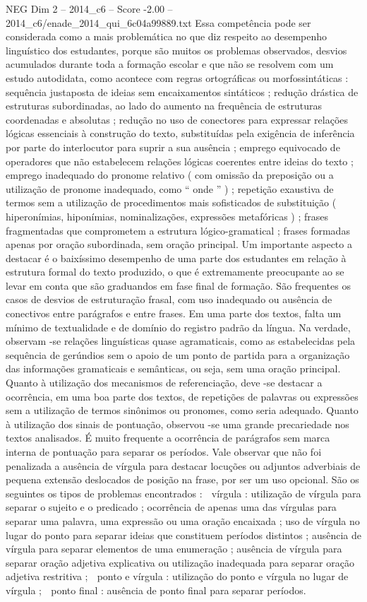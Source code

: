 \begin{textsample}{NEG Dim 2 – 2014\_c6 – Score -2.00 – 2014\_c6/enade\_2014\_qui\_6c04a99889.txt}
Essa competência pode ser considerada como a mais problemática no que diz respeito ao desempenho linguístico dos estudantes, porque são muitos os problemas observados, desvios acumulados durante toda a formação escolar e que não se resolvem com um estudo autodidata, como acontece com regras ortográficas ou morfossintáticas : sequência justaposta de ideias sem encaixamentos sintáticos ; redução drástica de estruturas subordinadas, ao lado do aumento na frequência de estruturas coordenadas e absolutas ; redução no uso de conectores para expressar relações lógicas essenciais à construção do texto, substituídas pela exigência de inferência por parte do interlocutor para suprir a sua ausência ; emprego equivocado de operadores que não estabelecem relações lógicas coerentes entre ideias do texto ; emprego inadequado do pronome relativo ( com omissão da preposição ou a utilização de pronome inadequado, como “ onde ” ) ; repetição exaustiva de termos sem a utilização de procedimentos mais sofisticados de substituição ( hiperonímias, hiponímias, nominalizações, expressões metafóricas ) ; frases fragmentadas que comprometem a estrutura lógico-gramatical ; frases formadas apenas por oração subordinada, sem oração principal.
Um importante aspecto a destacar é o baixíssimo desempenho de uma parte dos estudantes em relação à estrutura formal do texto produzido, o que é extremamente preocupante ao se levar em conta que são graduandos em fase final de formação.
São frequentes os casos de desvios de estruturação frasal, com uso inadequado ou ausência de conectivos entre parágrafos e entre frases.
Em uma parte dos textos, falta um mínimo de textualidade e de domínio do registro padrão da língua.
Na verdade, observam -se relações linguísticas quase agramaticais, como as estabelecidas pela sequência de gerúndios sem o apoio de um ponto de partida para a organização das informações gramaticais e semânticas, ou seja, sem uma oração principal.
Quanto à utilização dos mecanismos de referenciação, deve -se destacar a ocorrência, em uma boa parte dos textos, de repetições de palavras ou expressões sem a utilização de termos sinônimos ou pronomes, como seria adequado.
Quanto à utilização dos sinais de pontuação, observou -se uma grande precariedade nos textos analisados.
É muito frequente a ocorrência de parágrafos sem marca interna de pontuação para separar os períodos.
Vale observar que não foi penalizada a ausência de vírgula para destacar locuções ou adjuntos adverbiais de pequena extensão deslocados de posição na frase, por ser um uso opcional.
São os seguintes os tipos de problemas encontrados :  vírgula : utilização de vírgula para separar o sujeito e o predicado ; ocorrência de apenas uma das vírgulas para separar uma palavra, uma expressão ou uma oração encaixada ; uso de vírgula no lugar do ponto para separar ideias que constituem períodos distintos ; ausência de vírgula para separar elementos de uma enumeração ; ausência de vírgula para separar oração adjetiva explicativa ou utilização inadequada para separar oração adjetiva restritiva ;  ponto e vírgula : utilização do ponto e vírgula no lugar de vírgula ;  ponto final : ausência de ponto final para separar períodos.

\end{textsample}

